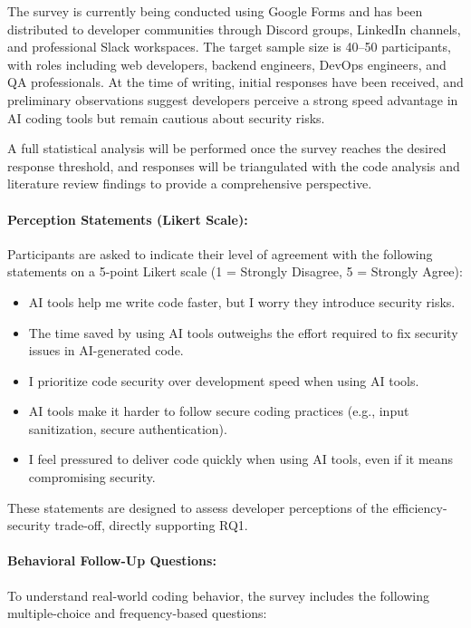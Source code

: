 The survey is currently being conducted using Google Forms and has been distributed to developer communities through Discord groups, LinkedIn channels, and professional Slack workspaces. The target sample size is 40–50 participants, with roles including web developers, backend engineers, DevOps engineers, and QA professionals. At the time of writing, initial responses have been received, and preliminary observations suggest developers perceive a strong speed advantage in AI coding tools but remain cautious about security risks.

A full statistical analysis will be performed once the survey reaches the desired response threshold, and responses will be triangulated with the code analysis and literature review findings to provide a comprehensive perspective.

\paragraph{Perception Statements (Likert Scale):}
Participants are asked to indicate their level of agreement with the following statements on a 5-point Likert scale (1 = Strongly Disagree, 5 = Strongly Agree):

\begin{itemize}
    \item AI tools help me write code faster, but I worry they introduce security risks.
    \item The time saved by using AI tools outweighs the effort required to fix security issues in AI-generated code.
    \item I prioritize code security over development speed when using AI tools.
    \item AI tools make it harder to follow secure coding practices (e.g., input sanitization, secure authentication).
    \item I feel pressured to deliver code quickly when using AI tools, even if it means compromising security.
\end{itemize}

These statements are designed to assess developer perceptions of the efficiency-security trade-off, directly supporting RQ1.

\vspace{0.5em}
\paragraph{Behavioral Follow-Up Questions:}
To understand real-world coding behavior, the survey includes the following multiple-choice and frequency-based questions:

